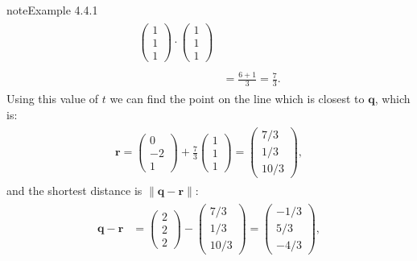 \documentclass[letterpaper,10pt,english]{jupyterBook}
\begin{document}
\begin{sphinxadmonition}{note}{Example 4.4.1}
\begin{equation*}
\begin{split}
\begin{align*}
{        \begin{pmatrix} 1 \\ 1 \\ 1 \end{pmatrix} \cdot
        \begin{pmatrix} 1 \\ 1 \\ 1 \end{pmatrix}} \\ \\
    &= \frac{6 + 1}{3} = \frac{7}{3}.
\end{align*} \end{split}
\end{equation*}
\sphinxAtStartPar
Using this value of \(t\) we can find the point on the line which is closest to \(\mathbf{q}\), which is:
\begin{equation*}
\begin{split} \begin{align*}
    \mathbf{r} =
    \begin{pmatrix} 0 \\ -2 \\ 1 \end{pmatrix} + \frac{7}{3}
    \begin{pmatrix} 1 \\ 1 \\ 1 \end{pmatrix} =
    \begin{pmatrix} 7/3 \\ 1/3 \\ 10/3 \end{pmatrix},
\end{align*} \end{split}
\end{equation*}
\sphinxAtStartPar
and the shortest distance is \(\|\mathbf{q} - \mathbf{r}\|\):
\begin{equation*}
\begin{split} \begin{align*}
    \mathbf{q} - \mathbf{r} &= \begin{pmatrix} 2 \\ 2 \\ 2 \end{pmatrix} -
    \begin{pmatrix} 7/3 \\ 1/3 \\ 10/3 \end{pmatrix} =
    \begin{pmatrix} - 1/3 \\ 5/3 \\ -4/3 \end{pmatrix}, \\ \\

\end{align*}
\end{split}
\end{equation*}
\end{sphinxadmonition}
\end{document}
